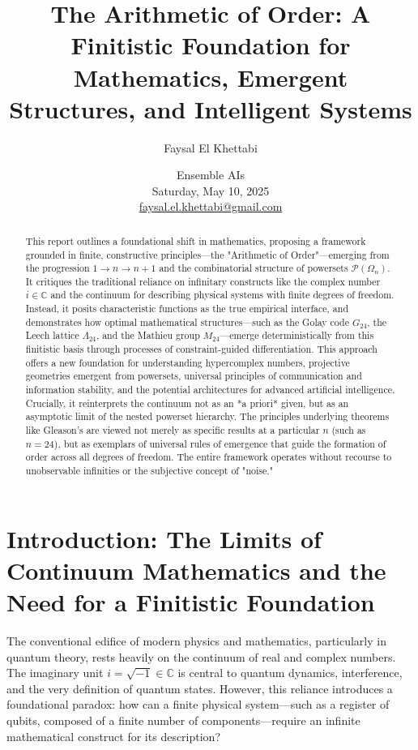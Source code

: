 \documentclass[11pt,a4paper]{article}
\title{\textbf{The Arithmetic of Order: A Finitistic Foundation for Mathematics, Emergent Structures, and Intelligent Systems}}
\author{Faysal El Khettabi}
\date{Ensemble AIs \\ Saturday, May 10, 2025 \\[1em] \href{mailto:faysal.el.khettabi@gmail.com}{faysal.el.khettabi@gmail.com}}
\begin{document}
\maketitle
\begin{abstract}
This report outlines a foundational shift in mathematics, proposing a framework grounded in finite, constructive principles—the "Arithmetic of Order"—emerging from the progression $1 \to n \to n+1$ and the combinatorial structure of powersets $\mathcal{P}(\Omega_n)$. It critiques the traditional reliance on infinitary constructs like the complex number $i \in \mathbb{C}$ and the continuum for describing physical systems with finite degrees of freedom. Instead, it posits characteristic functions as the true empirical interface, and demonstrates how optimal mathematical structures—such as the Golay code $G_{24}$, the Leech lattice $\Lambda_{24}$, and the Mathieu group $M_{24}$—emerge deterministically from this finitistic basis through processes of constraint-guided differentiation. This approach offers a new foundation for understanding hypercomplex numbers, projective geometries emergent from powersets, universal principles of communication and information stability, and the potential architectures for advanced artificial intelligence. Crucially, it reinterprets the continuum not as an *a priori* given, but as an asymptotic limit of the nested powerset hierarchy. The principles underlying theorems like Gleason's are viewed not merely as specific results at a particular $n$ (such as $n=24$), but as exemplars of universal rules of emergence that guide the formation of order across all degrees of freedom. The entire framework operates without recourse to unobservable infinities or the subjective concept of "noise."
\end{abstract}

\section{Introduction: The Limits of Continuum Mathematics and the Need for a Finitistic Foundation}

The conventional edifice of modern physics and mathematics, particularly in quantum theory, rests heavily on the continuum of real and complex numbers. The imaginary unit $i = \sqrt{-1} \in \mathbb{C}$ is central to quantum dynamics, interference, and the very definition of quantum states. However, this reliance introduces a foundational paradox: how can a finite physical system—such as a register of qubits, composed of a finite number of components—require an infinite mathematical construct for its description?
\end{document}
